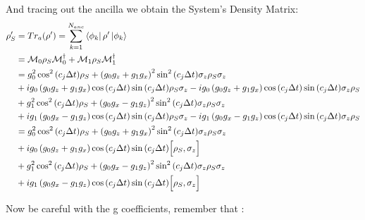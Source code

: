 \documentclass[a4paper,12pt]{article}
\begin{document}
	And tracing out the ancilla we obtain the System's Density Matrix:
	\begin{align}
		\rho_S' & = Tr_a(\rho') = \sum_{k=1}^{N_{anc}}{\bra{\phi_k}\rho'\ket{\phi_k}} \notag \\
		&=\mathcal{M}_{0} \rho_S \mathcal{M}_{0}^{\dagger} + \mathcal{M}_{1} \rho_S \mathcal{M}_{1}^{\dagger} \notag \\
		&= g_{0}^{2} \cos^{2}{\left(c_j \Delta t \right)} \rho_S + \left(g_0 g_z + g_1 g_x \right)^{2} \sin^{2}{\left(c_j \Delta t \right)} \sigma_{z} \rho_S \sigma_{z} \notag \\
		& + i g_{0} \left(g_0 g_z + g_1 g_x \right) \cos{\left(c_j \Delta t \right)} \sin{\left(c_j \Delta t \right)} \rho_S \sigma_{z}
		- i g_{0} \left(g_0 g_z + g_1 g_x \right) \cos{\left(c_j \Delta t \right)} \sin{\left(c_j \Delta t \right)} \sigma_{z} \rho_S \notag \\
		& + g_{1}^{2} \cos^{2}{\left(c_j \Delta t \right)} \rho_S + \left(g_0 g_x - g_1 g_z \right)^{2} \sin^{2}{\left(c_j \Delta t \right)} \sigma_{z} \rho_S \sigma_{z} \notag \\
		& + i g_{1} \left(g_0 g_x - g_1 g_z \right) \cos{\left(c_j \Delta t \right)} \sin{\left(c_j \Delta t \right)} \rho_S \sigma_{z}
		- i g_{1} \left(g_0 g_x - g_1 g_z \right) \cos{\left(c_j \Delta t \right)} \sin{\left(c_j \Delta t \right)} \sigma_{z} \rho_S \notag \\
		&= g_{0}^{2} \cos^{2}{\left(c_j \Delta t \right)} \rho_S + \left(g_0 g_z + g_1 g_x \right)^{2} \sin^{2}{\left(c_j \Delta t \right)} \sigma_{z} \rho_S \sigma_{z} \notag \\
		& + i g_{0} \left(g_0 g_z + g_1 g_x \right) \cos{\left(c_j \Delta t \right)} \sin{\left(c_j \Delta t \right)} \Big[\rho_S , \sigma_{z} \Big] \notag \\
		& + g_{1}^{2} \cos^{2}{\left(c_j \Delta t \right)} \rho_S + \left(g_0 g_x - g_1 g_z \right)^{2} \sin^{2}{\left(c_j \Delta t \right)} \sigma_{z} \rho_S \sigma_{z} \notag \\
		& + i g_{1} \left(g_0 g_x - g_1 g_z \right) \cos{\left(c_j \Delta t \right)} \sin{\left(c_j \Delta t \right)} \Big[\rho_S , \sigma_{z} \Big] \notag
	\end{align}

	Now be careful with the g coefficients, remember that :
\end{document}
